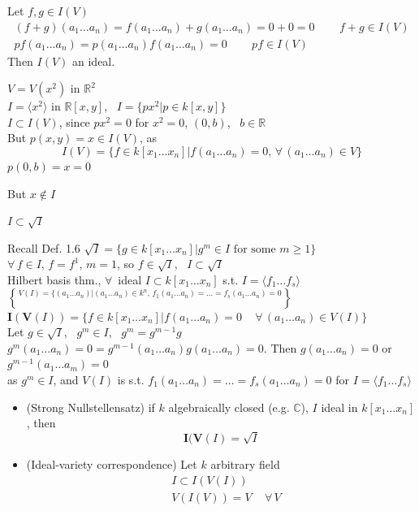 Let $f,g \in I(V)$ 
\[
\begin{gathered}
  (f+g)(a_1 \dots a_n) = f(a_1 \dots a_n) + g(a_1 \dots a_n) = 0 + 0 = 0 \quad \quad \, f+g \in I(V) \\ 
  pf(a_1 \dots a_n) = p(a_1 \dots a_n) f(a_1 \dots a_n) = 0 \quad \quad \, pf \in I(V)
\end{gathered}
\]
Then $I(V)$ an ideal.








$V = V(x^2)$ in $\mathbb{R}^2$ \\
$I=\langle x^2 \rangle$ in $\mathbb{R}[x,y]$, \, $I= \lbrace px^2 | p \in k[x,y]\rbrace$ \\
\phantom{ \quad } $I \subset I(V)$, since $px^2 = 0$ for $x^2=0$, $(0,b)$, \, $b\in \mathbb{R}$ \\
But $p(x,y) = x\in I(V)$, as 
\[
I(V) = \lbrace f \in k[x_1 \dots x_n] | f(a_1 \dots a_n)=0, \, \forall \, (a_1\dots a_n) \in V\rbrace
\]
\phantom{ \quad \quad } $p(0,b) = x = 0$

But $x\notin I$

 $I\subset \sqrt{I}$

Recall Def. 1.6 $\sqrt{I} = \lbrace g \in k[x_1 \dots x_n] |g^m \in I \text{ for some } m\geq 1\rbrace$ \\
$\forall \, f \in I$, $f=f^1$, $m=1$, so $f\in \sqrt{I}$, \quad \, $I\subset \sqrt{I}$ \\
\phantom{\quad \quad } Hilbert basis thm., $\forall \, $ ideal $I\subset k[x_1 \dots x_n]$ s.t. $I=\langle f_1 \dots f_s \rangle$ \\
\phantom{\quad } $V(I) = \lbrace (a_1 \dots a_n) |(a_1 \dots a_n) \in k^n, \, f_1(a_1\dots a_n) = \dots = f_s(a_1\dots a_n)=0\brace$ \\
$\mathbf{I}(\mathbf{V}(I)) = \lbrace f \in k[x_1 \dots x_n] | f(a_1 \dots a_n) =0 \quad \, \forall \, (a_1 \dots a_n) \in V(I) \rbrace$ \\
Let $g\in \sqrt{I}$, \, $g^m \in I$, \, $g^m=g^{m-1}g$  \\
\phantom{\quad \quad \,} $g^m(a_1 \dots a_n) =0 = g^{m-1}(a_1 \dots a_n)g(a_1 \dots a_n) =0$.  Then $g(a_1 \dots a_n)=0$ or $g^{m-1}(a_1\dots a_m)=0$ \\
\phantom{\quad }as $g^m\in I$, and $V(I)$ is s.t. $f_1(a_1 \dots a_n) = \dots = f_s(a_1 \dots a_n)=0$ for $I=\langle f_1 \dots f_s \rangle$

\begin{itemize}
  \item (Strong Nullstellensatz) if $k$ algebraically closed (e.g. $\mathbb{C}$), $I$ ideal in $k[x_1 \dots x_n]$, then 
\[
\mathbf{I}(\mathbf{V}(I) = \sqrt{I}
\]
\item (Ideal-variety correspondence) Let $k$ arbitrary field
\[
\begin{aligned}
  & I \subset I(V(I)) \\ 
  & V(I(V)) = V \quad \, \forall \, V
\end{aligned}
\]
\end{itemize}

